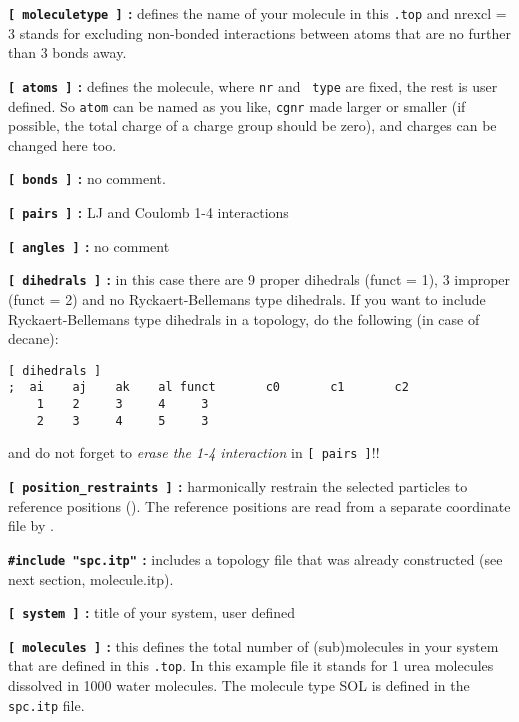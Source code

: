 {\bf {\tt [~moleculetype~]} :} defines the name of your molecule in
this {\tt *.top} and nrexcl = 3 stands for excluding non-bonded
interactions between atoms that are no further than 3 bonds away.

{\bf {\tt [~atoms~]} :} defines the molecule, where {\tt nr} and {\tt
type} are fixed, the rest is user defined. So {\tt atom} can be named
as you like, {\tt cgnr} made larger or smaller (if possible, the total
charge of a charge group should be zero), and charges can be changed
here too.

{\bf {\tt [~bonds~]} :} no comment.

{\bf {\tt [~pairs~]} :} LJ and Coulomb 1-4 interactions

{\bf {\tt [~angles~]} :} no comment

{\bf {\tt [~dihedrals~]} :} in this case there are 9 proper dihedrals
(funct = 1), 3 improper (funct = 2) and no Ryckaert-Bellemans type
dihedrals. If you want to include Ryckaert-Bellemans type dihedrals
in a topology, do the following (in case of {\eg} decane):
\begin{verbatim}
[ dihedrals ]
;  ai    aj    ak    al funct       c0       c1       c2
    1    2     3     4     3 
    2    3     4     5     3
\end{verbatim}
and do not forget to {\em erase the 1-4 interaction} 
in {\tt [~pairs~]}!!

{\bf {\tt [~position\_restraints~]} :} harmonically restrain the selected particles
to reference positions (). 
The reference positions are read from a 
separate coordinate file by .

{\bf {\tt \#include "spc.itp"} :} includes a topology file that was already
constructed (see next section, molecule.itp).

{\bf {\tt [~system~]} :} title of your system, user defined

{\bf {\tt [~molecules~]} :} this defines the total number of (sub)molecules
in your system that are defined in this {\tt *.top}. In this
example file it stands for 1 urea molecules dissolved in 1000 water
molecules. The molecule type SOL is defined in the {\tt spc.itp} file.

